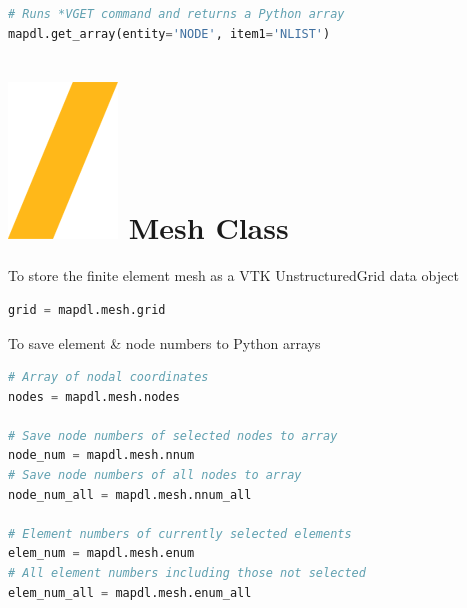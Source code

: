 \documentclass[9pt,landscape]{article}
\begin{document}
\begin{multicols}{3}
\begin{lstlisting}[language=Python]
# Runs *VGET command and returns a Python array
mapdl.get_array(entity='NODE', item1='NLIST')
\end{lstlisting} 

\section{\includegraphics[height=\fontcharht\font`\S]{slash.png} Mesh Class}
To store the finite element mesh as a VTK UnstructuredGrid data object
\begin{lstlisting}[language=Python]
grid = mapdl.mesh.grid
\end{lstlisting} 

To save element \& node numbers to Python arrays
\begin{lstlisting}[language=Python]
# Array of nodal coordinates
nodes = mapdl.mesh.nodes

# Save node numbers of selected nodes to array
node_num = mapdl.mesh.nnum
# Save node numbers of all nodes to array
node_num_all = mapdl.mesh.nnum_all

# Element numbers of currently selected elements
elem_num = mapdl.mesh.enum
# All element numbers including those not selected
elem_num_all = mapdl.mesh.enum_all
\end{lstlisting} 
\vfill

\columnbreak


\end{multicols}
\end{document}
